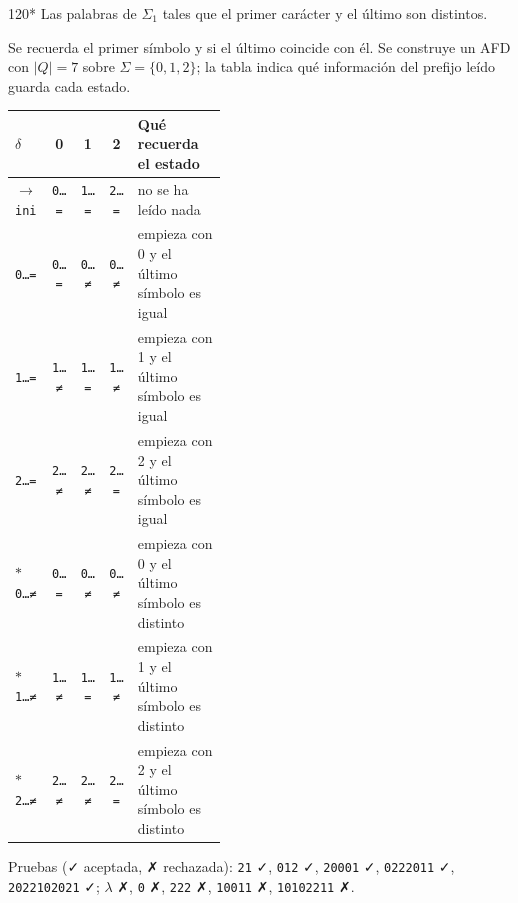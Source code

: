 \documentclass[11pt]{article}
\begin{document}
\begin{ejercicio}{120}{*}
Las palabras de $\Sigma_1$ tales que el primer carácter y el último son distintos.
\end{ejercicio}
\proc Se recuerda el primer símbolo y si el último coincide con él. Se construye un AFD con $|Q| = 7$ sobre $\Sigma = \{0, 1, 2\}$; la tabla indica qué información del prefijo leído guarda cada estado.
\begin{center}\small\begin{tabular}{lcccp{0.42\linewidth}}\toprule
$\delta$ & 0 & 1 & 2 & Qué recuerda el estado \\\midrule
$\to$ \texttt{ini} & \texttt{0…=} & \texttt{1…=} & \texttt{2…=} & no se ha leído nada \\
 \texttt{0…=} & \texttt{0…=} & \texttt{0…≠} & \texttt{0…≠} & empieza con 0 y el último símbolo es igual \\
 \texttt{1…=} & \texttt{1…≠} & \texttt{1…=} & \texttt{1…≠} & empieza con 1 y el último símbolo es igual \\
 \texttt{2…=} & \texttt{2…≠} & \texttt{2…≠} & \texttt{2…=} & empieza con 2 y el último símbolo es igual \\
$*$ \texttt{0…≠} & \texttt{0…=} & \texttt{0…≠} & \texttt{0…≠} & empieza con 0 y el último símbolo es distinto \\
$*$ \texttt{1…≠} & \texttt{1…≠} & \texttt{1…=} & \texttt{1…≠} & empieza con 1 y el último símbolo es distinto \\
$*$ \texttt{2…≠} & \texttt{2…≠} & \texttt{2…≠} & \texttt{2…=} & empieza con 2 y el último símbolo es distinto \\
\bottomrule\end{tabular}\end{center}
Pruebas (✓ aceptada, ✗ rechazada): \texttt{21} ✓, \texttt{012} ✓, \texttt{20001} ✓, \texttt{0222011} ✓, \texttt{2022102021} ✓; $\lambda$ ✗, \texttt{0} ✗, \texttt{222} ✗, \texttt{10011} ✗, \texttt{10102211} ✗.
\end{document}
